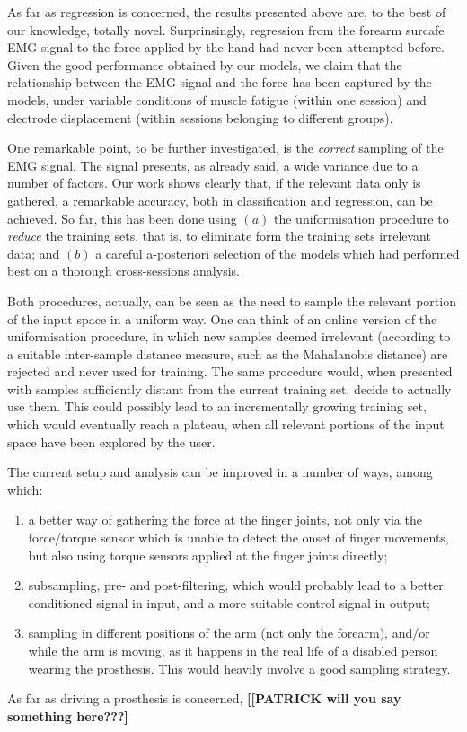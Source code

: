 As far as regression is concerned, the results presented above are, to
the best of our knowledge, totally novel. Surprinsingly, regression
from the forearm surcafe EMG signal to the force applied by the hand
had never been attempted before. Given the good performance obtained
by our models, we claim that the relationship between the EMG signal
and the force has been captured by the models, under variable
conditions of muscle fatigue (within one session) and electrode
displacement (within sessions belonging to different groups).

One remarkable point, to be further investigated, is the
\emph{correct} sampling of the EMG signal. The signal presents, as
already said, a wide variance due to a number of factors. Our work
shows clearly that, if the relevant data only is gathered, a
remarkable accuracy, both in classification and regression, can be
achieved. So far, this has been done using $(a)$ the uniformisation
procedure to \emph{reduce} the training sets, that is, to eliminate
form the training sets irrelevant data; and $(b)$ a careful
a-posteriori selection of the models which had performed best on a
thorough cross-sessions analysis.

Both procedures, actually, can be seen as the need to sample the
relevant portion of the input space in a uniform way. One can think of
an online version of the uniformisation procedure, in which new
samples deemed irrelevant (according to a suitable inter-sample
distance measure, such as the Mahalanobis distance) are rejected and
never used for training. The same procedure would, when presented with
samples sufficiently distant from the current training set, decide to
actually use them. This could possibly lead to an incrementally
growing training set, which would eventually reach a plateau, when all
relevant portions of the input space have been explored by the user.

The current setup and analysis can be improved in a number of ways,
among which:

\begin{enumerate}

  \item a better way of gathering the force at the finger joints, not
    only via the force/torque sensor which is unable to detect the
    onset of finger movements, but also using torque sensors applied
    at the finger joints directly;

  \item subsampling, pre- and post-filtering, which would probably
    lead to a better conditioned signal in input, and a more suitable
    control signal in output;

  \item sampling in different positions of the arm (not only the
    forearm), and/or while the arm is moving, as it happens in the
    real life of a disabled person wearing the prosthesis. This would
    heavily involve a good sampling strategy.

\end{enumerate}

As far as driving a prosthesis is concerned, \textbf{[[PATRICK will
you say something here???]}
